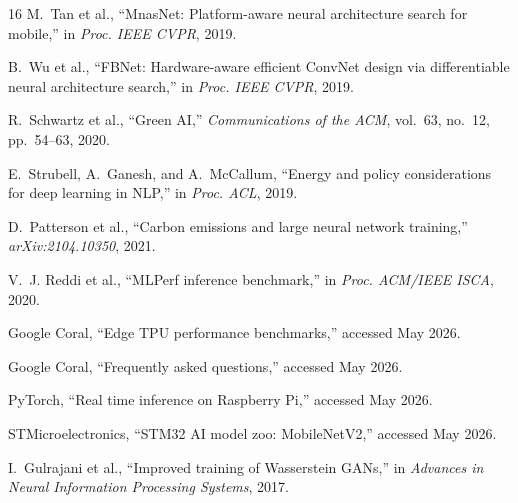 \documentclass[conference]{IEEEtran}
\begin{document}
\begin{thebibliography}{16}
M.~Tan et al., ``MnasNet: Platform-aware neural architecture search for
mobile,'' in \emph{Proc. IEEE CVPR}, 2019.

B.~Wu et al., ``FBNet: Hardware-aware efficient ConvNet design via
differentiable neural architecture search,'' in \emph{Proc. IEEE CVPR}, 2019.

R.~Schwartz et al., ``Green AI,'' \emph{Communications of the ACM}, vol.~63,
no.~12, pp.~54--63, 2020.

E.~Strubell, A.~Ganesh, and A.~McCallum, ``Energy and policy considerations
for deep learning in NLP,'' in \emph{Proc. ACL}, 2019.

D.~Patterson et al., ``Carbon emissions and large neural network training,''
\emph{arXiv:2104.10350}, 2021.

V.~J. Reddi et al., ``MLPerf inference benchmark,'' in \emph{Proc. ACM/IEEE
ISCA}, 2020.

Google Coral, ``Edge TPU performance benchmarks,'' accessed May 2026.

Google Coral, ``Frequently asked questions,'' accessed May 2026.

PyTorch, ``Real time inference on Raspberry Pi,'' accessed May 2026.

STMicroelectronics, ``STM32 AI model zoo: MobileNetV2,'' accessed May 2026.

I.~Gulrajani et al., ``Improved training of Wasserstein GANs,'' in
\emph{Advances in Neural Information Processing Systems}, 2017.

\end{thebibliography}
\end{document}
